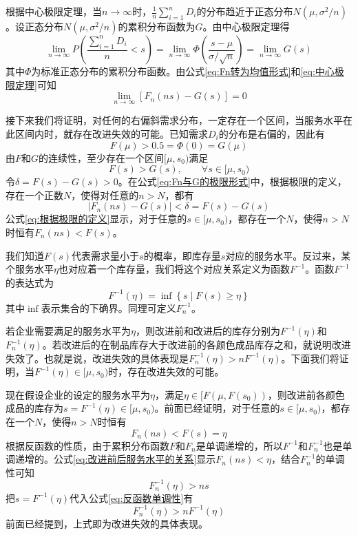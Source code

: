 根据中心极限定理，当$n\to\infty$时，$\frac{1}{n}\sum_{i=1}^nD_i$的分布趋近于正态分布$N(\mu,\sigma^2/n)$。设正态分布$N(\mu,\sigma^2/n)$的累积分布函数为$G$。由中心极限定理得
\begin{equation}
\lim_{n\to\infty}P\left(\frac{\sum_{i=1}^nD_i}{n}<s\right) = \lim_{n\to\infty}\Phi\left(\frac{s-\mu}{\sigma/\sqrt{n}}\right) = \lim_{n\to\infty}G(s)
\label{eq:中心极限定理}
\end{equation}
其中$\Phi$为标准正态分布的累积分布函数。由公式\ref{eq:Fn转为均值形式}和\ref{eq:中心极限定理}可知
\begin{equation}
\lim_{n\to\infty}[F_n(ns)-G(s)]=0
\label{eq:Fn与G的极限形式}
\end{equation}

接下来我们将证明，对任何的右偏斜需求分布，一定存在一个区间，当服务水平在此区间内时，就存在改进失效的可能。已知需求$D_i$的分布是右偏的，因此有
\begin{equation}
F(\mu) > 0.5 = \Phi(0) = G(\mu)
\label{eq:右偏斜的性质}
\end{equation}
由$F$和$G$的连续性，至少存在一个区间$[\mu,s_0)$满足
\[
F(s) > G(s),\qquad \forall s\in[\mu,s_0)
\]
令$\delta=F(s)-G(s)>0$。在公式\ref{eq:Fn与G的极限形式}中，根据极限的定义，存在一个正数$N$，使得对任意的$n>N$，都有
\begin{equation}
|F_n(ns)-G(s)| < \delta = F(s) - G(s)
\label{eq:根据极限的定义}
\end{equation}
公式\ref{eq:根据极限的定义}显示，对于任意的$s\in[\mu,s_0)$，都存在一个$N$，使得$n>N$时恒有$F_n(ns)<F(s)$。

我们知道$F(s)$代表需求量小于$s$的概率，即库存量$s$对应的服务水平。反过来，某个服务水平$\eta$也对应着一个库存量，我们将这个对应关系定义为函数$F^{-1}$。函数$F^{-1}$的表达式为
\[
F^{-1}(\eta) = \inf\left\{s\middle|F(s)\geq\eta\right\}
\]
其中$\inf$表示集合的下确界。同理可定义$F_n^{-1}$。

若企业需要满足的服务水平为$\eta$，则改进前和改进后的库存分别为$F^{-1}(\eta)$和$F_n^{-1}(\eta)$。若改进后的在制品库存大于改进前的各颜色成品库存之和，就说明改进失效了。也就是说，改进失效的具体表现是$F_n^{-1}(\eta)>nF^{-1}(\eta)$。下面我们将证明，当$F^{-1}(\eta)\in[\mu,s_0)$时，存在改进失效的可能。

现在假设企业的设定的服务水平为$\eta$，满足$\eta\in[F(\mu,F(s_0))$，则改进前各颜色成品的库存为$s=F^{-1}(\eta)\in[\mu,s_0)$。前面已经证明，对于任意的$s\in[\mu,s_0)$，都存在一个$N$，使得$n>N$时恒有
\begin{equation}
F_n(ns)<F(s)=\eta
\label{eq:改进前后服务水平的关系}
\end{equation}
根据反函数的性质，由于累积分布函数$F$和$F_n$是单调递增的，所以$F^{-1}$和$F_n^{-1}$也是单调递增的。公式\ref{eq:改进前后服务水平的关系}显示$F_n(ns)<\eta$，结合$F_n^{-1}$的单调性可知
\begin{equation}
F_n^{-1}(\eta) > ns
\label{eq:反函数单调性}
\end{equation}
把$s=F^{-1}(\eta)$代入公式\ref{eq:反函数单调性}有
\[
F_n^{-1}(\eta)>nF^{-1}(\eta)
\]
前面已经提到，上式即为改进失效的具体表现。

